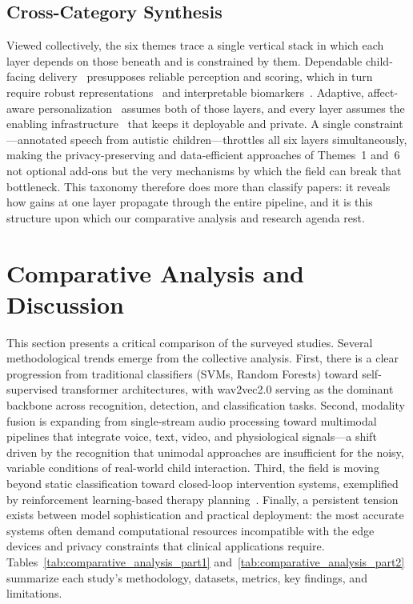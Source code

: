 \documentclass[conference]{IEEEtran}
\begin{document}
\subsection{Cross-Category Synthesis}

Viewed collectively, the six themes trace a single vertical stack in which each layer depends on those beneath and is constrained by them. Dependable child-facing delivery~\cite{ref12,ref13,ref14,ref15,ref16,ref17} presupposes reliable perception and scoring, which in turn require robust representations~\cite{ref1,ref2,ref3,ref4,ref5} and interpretable biomarkers~\cite{ref6,ref7,ref8,ref9}. Adaptive, affect-aware personalization~\cite{ref10,ref11,ref18,ref19} assumes both of those layers, and every layer assumes the enabling infrastructure~\cite{ref20,ref21,ref22,ref23,ref24} that keeps it deployable and private. A single constraint---annotated speech from autistic children---throttles all six layers simultaneously, making the privacy-preserving and data-efficient approaches of Themes~1 and~6 not optional add-ons but the very mechanisms by which the field can break that bottleneck. This taxonomy therefore does more than classify papers: it reveals how gains at one layer propagate through the entire pipeline, and it is this structure upon which our comparative analysis and research agenda rest.

\section{Comparative Analysis and Discussion}
\label{sec:analysis}

This section presents a critical comparison of the surveyed studies. Several methodological trends emerge from the collective analysis. First, there is a clear progression from traditional classifiers (SVMs, Random Forests) toward self-supervised transformer architectures, with wav2vec2.0 serving as the dominant backbone across recognition, detection, and classification tasks. Second, modality fusion is expanding from single-stream audio processing toward multimodal pipelines that integrate voice, text, video, and physiological signals---a shift driven by the recognition that unimodal approaches are insufficient for the noisy, variable conditions of real-world child interaction. Third, the field is moving beyond static classification toward closed-loop intervention systems, exemplified by reinforcement learning-based therapy planning~\cite{ref11}. Finally, a persistent tension exists between model sophistication and practical deployment: the most accurate systems often demand computational resources incompatible with the edge devices and privacy constraints that clinical applications require. Tables~\ref{tab:comparative_analysis_part1} and~\ref{tab:comparative_analysis_part2} summarize each study's methodology, datasets, metrics, key findings, and limitations.
\end{document}
